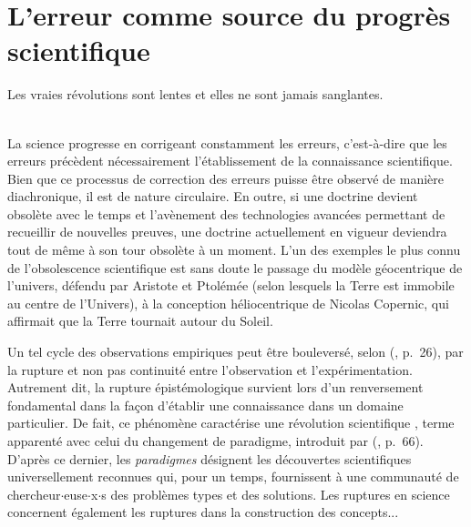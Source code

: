 \label{circulations}
\minitoc%
\section{L'erreur comme source du progrès scientifique}
\begin{myepigraph}
\small
\og{}Les vraies révolutions sont lentes et elles ne sont jamais sanglantes.\fg{}\\[-1ex]
\\ 
\end{myepigraph}
\medskip
La science progresse en corrigeant constamment les erreurs, c'est-à-dire que les erreurs précèdent nécessairement l'établissement de la connaissance scientifique. Bien que ce processus de correction des erreurs puisse être observé de manière diachronique, il est de nature circulaire. En outre, si une doctrine devient obsolète avec le temps et l'avènement des technologies avancées permettant de recueillir de nouvelles preuves, une doctrine actuellement en vigueur deviendra tout de même à son tour obsolète à un moment. L'un des exemples le plus connu de l'obsolescence scientifique est sans doute le passage du modèle géocentrique de l'univers, défendu par Aristote et Ptolémée (selon lesquels la Terre est immobile au centre de l'Univers), à la conception héliocentrique de Nicolas Copernic, qui affirmait que la Terre tournait autour du Soleil.  


Un tel cycle des observations empiriques peut être bouleversé, selon \citeauthor{bachelard1934formation} (\citeyear{bachelard1934formation}, p.~26), par la \og{}rupture et non pas continuité entre l'observation et l'expérimentation\fg{}. Autrement dit, la rupture épistémologique survient lors d'un renversement fondamental dans la façon d'établir une connaissance dans un domaine particulier. De fait, ce phénomène caractérise une \og{}révolution scientifique\fg{} \citep[p.~2]{koyre1957closed}, terme apparenté avec celui du \og{}changement de paradigme\fg{}, introduit par \citeauthor{kuhn1962structure} (\citeyear{kuhn1962structure}, p.~66). D'après ce dernier, les \textit{paradigmes} désignent les \og{}découvertes scientifiques universellement reconnues qui, pour un temps, fournissent à une communauté de chercheur$\cdot$euse$\cdot$x$\cdot$s des problèmes types et des solutions\fg{}. Les ruptures en science concernent également les ruptures dans la construction des concepts...   \citep[p.~24]{astolfi2008chapitre} 

